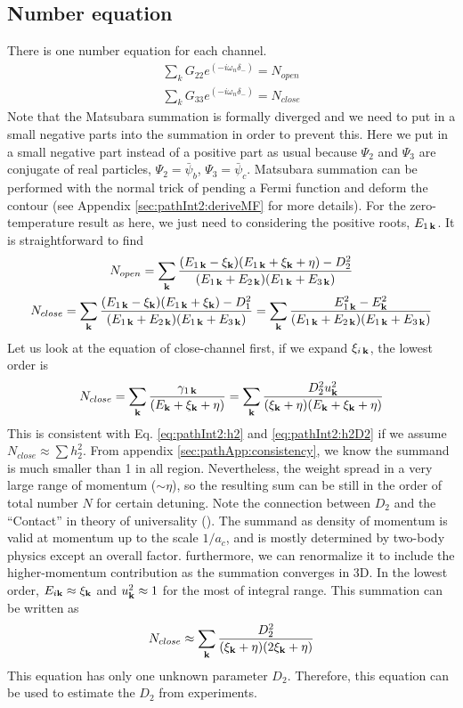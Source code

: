 \subsection{Number equation}
There is one  number equation for each channel.  
\begin{gather*}
\sum_{k}G_{22}e^{(-i\omega_n\delta_-)}=N_{open}\\
\sum_{k}G_{33}e^{(-i\omega_n\delta_-)}=N_{close}
\end{gather*}
Note that the Matsubara summation is formally diverged and we need to put in a small negative parts into the summation in order to prevent this.  Here we put in a small  negative part instead of a positive part as usual  because $\Psi_{2}$ and $\Psi_{3}$ are conjugate of real particles, $\Psi_2=\bar\psi_b$, $\Psi_3=\bar\psi_c$.  Matsubara summation can be performed with the normal trick of pending a Fermi function and deform the contour  (see Appendix \ref{sec:pathInt2:deriveMF} for more details).  For the zero-temperature result as here, we just need to considering the positive roots, $E_{1\,\mathbf{k}}$.  It is straightforward to find 
\begin{gather}
N_{open}=\sum_{\mathbf{k}}\frac{(E_{1\,\mathbf{k}}-\xi_{\mathbf{k}})(E_{1\,\mathbf{k}}+\xi_{\mathbf{k}}+\eta)-D_2^2}{(E_{1\,\mathbf{k}}+E_{2\,\mathbf{k}})(E_{1\,\mathbf{k}}+E_{3\,\mathbf{k}})}\\
N_{close}=\sum_{\mathbf{k}}\frac{(E_{1\,\mathbf{k}}-\xi_{\mathbf{k}})(E_{1\,\mathbf{k}}+\xi_{\mathbf{k}})-D_1^2}{(E_{1\,\mathbf{k}}+E_{2\,\mathbf{k}})(E_{1\,\mathbf{k}}+E_{3\,\mathbf{k}})}
=\sum_{\mathbf{k}}\frac{E_{1\,\mathbf{k}}^2-E_{\mathbf{k}}^2}{(E_{1\,\mathbf{k}}+E_{2\,\mathbf{k}})(E_{1\,\mathbf{k}}+E_{3\,\mathbf{k}})}\label{eq:pathInt2:numClose}
\end{gather}
Let us look at the equation of close-channel first, if we expand $\xi_{i\,\mathbf{k}}$, the lowest order is 
\begin{equation}
N_{close}=\sum_{\mathbf{k}}\frac{\gamma_{1\,\mathbf{k}}}{(E_{\mathbf{k}}+\xi_{\mathbf{k}}+\eta)}=\sum_{\mathbf{k}}\frac{D_{2}^2u_{\mathbf{k}}^{2}}{(\xi_{\mathbf{k}}+\eta)(E_{\mathbf{k}}+\xi_{\mathbf{k}}+\eta)}
\end{equation}
This is consistent with Eq. \ref{eq:pathInt2:h2} and \ref{eq:pathInt2:h2D2} if we assume $N_{close}\approx\sum{h_{2}^{2}}$.  From appendix \ref{sec:pathApp:consistency}, we know the summand is much smaller than 1 in all region.  Nevertheless, the weight spread in a very large range of momentum ($\sim\eta$), so the resulting sum can be still in the order of total number $N$ for certain detuning. Note the connection between $D_{2}$ and the ``Contact'' in theory of universality (\cite{Tan2008-1,Tan2008-2}).  The summand as  density of momentum is valid at momentum up to the scale $1/a_{c}$, and is mostly determined by two-body physics except an overall factor.  furthermore, we can renormalize it to include the higher-momentum contribution as the summation converges in 3D.  In the lowest order, $E_{i\mathbf{k}}\approx\xi_{\mathbf{k}}$ and $u_{\mathbf{k}}^2\approx1$ for the most of integral range.  This summation can be written as 
\begin{equation}\label{eq:pathInt2:closeD2}
N_{close}\approx\sum_{\mathbf{k}}\frac{D_{2}^2}{(\xi_{\mathbf{k}}+\eta)(2\xi_{\mathbf{k}}+\eta)}
\end{equation}
This equation has only one unknown parameter $D_{2}$.  Therefore, this equation can be used to estimate the $D_{2}$ from experiments.  

